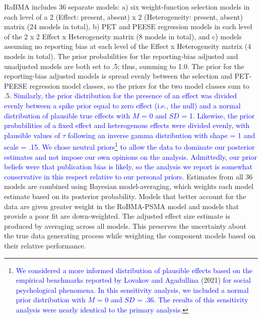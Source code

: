 \documentclass[
  man, donotrepeattitle,mask,floatsintext]{apa7}
\begin{document}
RoBMA includes 36 separate models: a) six weight-function selection models in each level of a 2 (Effect: present, absent) x 2 (Heterogeneity: present, absent) matrix (24 models in total), b) PET and PEESE regression models in each level of the 2 x 2 Effect x Heterogeneity matrix (8 models in total), and c) models assuming no reporting bias at each level of the Effect x Heterogeneity matrix (4 models in total). The prior probabilities for the reporting-bias adjusted and unadjusted models are both set to .5; thus, summing to 1.0. The prior for the reporting-bias adjusted models is spread evenly between the selection and PET-PEESE regression model classes, so the priors for the two model classes sum to .5. \textcolor{blue}{Similarly, the prior distribution for the presence of an effect was divided evenly between a spike prior equal to zero effect (i.e., the null) and a normal distribution of plausible true effects with $M$ = 0 and $SD$ = 1. Likewise, the prior probabilities of a fixed effect and heterogenous effects were divided evenly, with plausible values of $\tau$ following an inverse gamma distribution with shape = 1 and scale = .15. We chose neutral priors}\footnote{\textcolor{blue}{We considered a more informed distribution of plausible effects based on the empirical benchmarks reported by Lovakov and Agadullina} (2021) \textcolor{blue}{for social psychological phenomena. In this sensitivity analysis, we included a normal prior distribution with $M$ = 0 and $SD$ = .36. The results of this sensitivity analysis were nearly identical to the primary analysis.}} \textcolor{blue}{to allow the data to dominate our posterior estimates and not impose our own opinions on the analysis. Admittedly, our prior beliefs were that publication bias is likely, so the analysis we report is somewhat conservative in this respect relative to our personal priors.} Estimates from all 36 models are combined using Bayesian model-averaging, which weights each model estimate based on its posterior probability. Models that better account for the data are given greater weight in the RoBMA-PSMA model and models that provide a poor fit are down-weighted. The adjusted effect size estimate is produced by averaging across all models. This preserves the uncertainty about the true data generating process while weighting the component models based on their relative performance.
\end{document}
